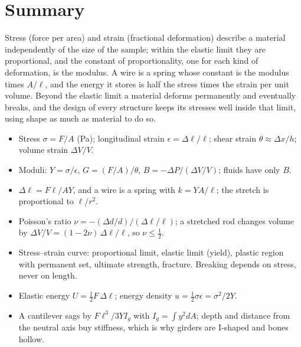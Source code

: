 
\section{Summary}\label{sec:summary-solids}

Stress (force per area) and strain (fractional deformation) describe a material independently of the size
of the sample; within the elastic limit they are proportional, and the constant of proportionality, one
for each kind of deformation, is the modulus. A wire is a spring whose constant is the modulus times
$A/\ell$, and the energy it stores is half the stress times the strain per unit volume. Beyond the elastic
limit a material deforms permanently and eventually breaks, and the design of every structure keeps its
stresses well inside that limit, using shape as much as material to do so.

\begin{itemize}
\item Stress $\sigma=F/A$ (\si{Pa}); longitudinal strain $\epsilon=\Delta\ell/\ell$; shear strain
      $\theta\approx\Delta x/h$; volume strain $\Delta V/V$.
\item Moduli: $Y=\sigma/\epsilon$, $G=(F/A)/\theta$, $B=-\Delta P/(\Delta V/V)$; fluids have only $B$.
\item $\Delta\ell=F\ell/AY$, and a wire is a spring with $k=YA/\ell$; the stretch is proportional to
      $\ell/r^{2}$.
\item Poisson's ratio $\nu=-(\Delta d/d)/(\Delta\ell/\ell)$; a stretched rod changes volume by
      $\Delta V/V=(1-2\nu)\,\Delta\ell/\ell$, so $\nu\le\tfrac12$.
\item Stress--strain curve: proportional limit, elastic limit (yield), plastic region with permanent set,
      ultimate strength, fracture. Breaking depends on stress, never on length.
\item Elastic energy $U=\tfrac12F\,\Delta\ell$; energy density $u=\tfrac12\sigma\epsilon=\sigma^{2}/2Y$.
\item A cantilever sags by $F\ell^{3}/3YI_g$ with $I_g=\int y^{2}dA$; depth and distance from the neutral
      axis buy stiffness, which is why girders are I-shaped and bones hollow.
\end{itemize}

